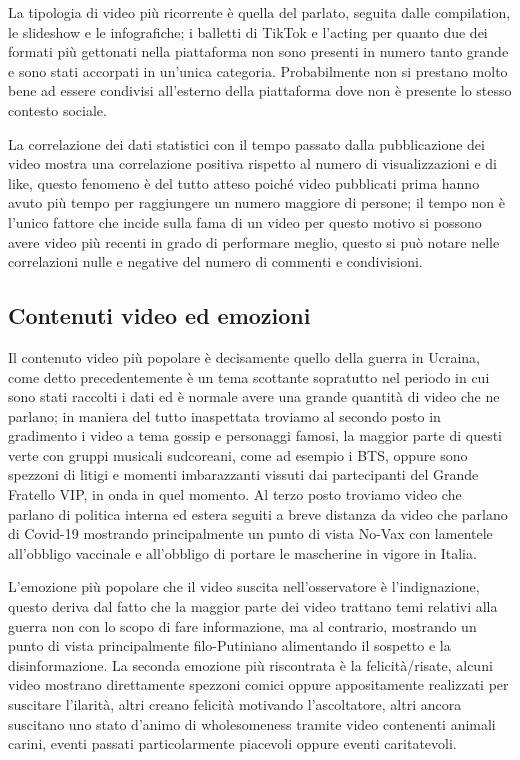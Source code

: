 La tipologia di video più ricorrente è quella del parlato, seguita dalle compilation, le slideshow e le infografiche; i balletti di TikTok e 
l'acting per quanto due dei formati più gettonati nella piattaforma non sono presenti in numero tanto grande e sono stati accorpati in 
un'unica categoria. Probabilmente non si prestano molto bene ad essere condivisi all'esterno della piattaforma dove non è presente lo stesso 
contesto sociale.

La correlazione dei dati statistici con il tempo passato dalla pubblicazione dei video mostra una correlazione positiva rispetto al numero 
di visualizzazioni e di like, questo fenomeno è del tutto atteso poiché video pubblicati prima hanno avuto più tempo per raggiungere 
un numero maggiore di persone; il tempo non è l'unico fattore che incide sulla fama di un video per questo motivo si possono avere 
video più recenti in grado di performare meglio, questo si può notare nelle correlazioni nulle e negative del numero di commenti e 
condivisioni.

\subsection{Contenuti video ed emozioni}

Il contenuto video più popolare è decisamente quello della guerra in Ucraina, come detto precedentemente è un tema scottante sopratutto nel 
periodo in cui sono stati raccolti i dati ed è normale avere una grande quantità di video che ne parlano; in maniera del tutto 
inaspettata troviamo al secondo posto in gradimento i video a tema gossip e personaggi famosi, la maggior parte di questi verte con gruppi 
musicali sudcoreani, come ad esempio i BTS, oppure sono spezzoni di litigi e momenti imbarazzanti vissuti 
dai partecipanti del Grande Fratello VIP, in onda in quel momento. Al terzo posto troviamo video che parlano di politica interna ed 
estera seguiti a breve distanza da video che parlano di Covid-19 mostrando principalmente un punto di vista No-Vax con 
lamentele all'obbligo vaccinale e all'obbligo di portare le mascherine in vigore in Italia.

L'emozione più popolare che il video suscita nell'osservatore è l'indignazione, questo deriva dal fatto che la maggior parte dei video 
trattano temi relativi alla guerra non con lo scopo di fare informazione, ma al contrario, mostrando un punto di vista principalmente 
filo-Putiniano alimentando il sospetto e la disinformazione.
La seconda emozione più riscontrata è la felicità/risate, alcuni video mostrano direttamente spezzoni comici oppure appositamente 
realizzati per suscitare l'ilarità, 
altri creano felicità motivando l'ascoltatore, altri ancora suscitano uno stato d'animo di wholesomeness tramite video contenenti 
animali carini, eventi passati particolarmente piacevoli oppure eventi caritatevoli.

